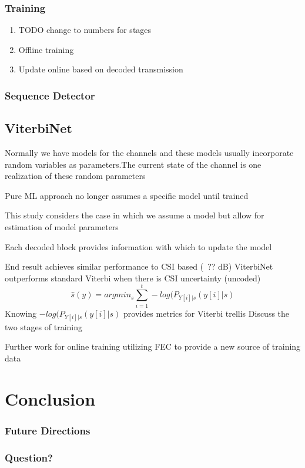 \documentclass{beamer}
\begin{document}
\begin{frame}
	\frametitle{Training}
	\begin{enumerate}
			\item TODO change to numbers for stages
		\item Offline training
		\item Update online based on decoded transmission
	\end{enumerate}
\end{frame}

\begin{frame}
	\frametitle{Sequence Detector}
\end{frame}

\subsection{ViterbiNet}



\begin{frame}
Normally we have models for the channels and these models usually incorporate random variables as parameters.The current state of the channel is one realization of these random parameters

Pure ML approach no longer assumes a specific model until trained

This study considers the case in which we assume a model but allow for estimation of model parameters

Each decoded block provides information with which to update the model



	End result achieves similar performance to CSI based (~?? dB)
	ViterbiNet outperforms standard Viterbi when there is CSI uncertainty (uncoded)
\begin{equation}
	\hat{s}(y) = argmin_s\sum_{i=1}^{t}-log(P_{Y[i]|s}(y[i]|s)
\end{equation}
	Knowing $-log(P_{Y[i]|s}(y[i]|s)$ provides metrics for Viterbi trellis
	Discuss the two stages of training

	Further work for online training utilizing FEC to provide a new source of training data
\end{frame}

\section{Conclusion}

\begin{frame}
\frametitle{Future Directions}
\begin{large}

\end{large}
\end{frame}

\begin{frame}
\frametitle{Question?}
\begin{large}

\end{large}
\end{frame}

\begin{frame}
\begin{tiny}
	\printbibliography[title={References}]

\end{tiny}
\end{frame}
\end{document}

